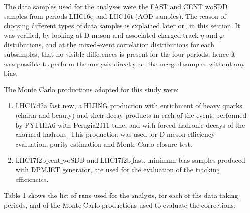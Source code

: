 The data samples used for the analyses were the FAST and CENT$\_$woSDD samples from periods LHC16q and LHC16t (AOD samples). The reason of choosing different types of data samples is explained later on, in this section. It was verified, by looking at D-meson and associated charged track $\eta$ and $\varphi$ distributions, and at the mixed-event correlation distributions for each subsamples, that no visible differences is present for the four periods, hence it was possible to perform the analysis directly on the merged samples without any bias.

The Monte Carlo productions adopted for this study were:
 \begin{enumerate}
 \item LHC17d2a$\_$fast$\_$new, a HIJING production with enrichment of heavy quarks (charm and beauty) and their decay products in each of the event, performed by PYTHIA6 with Perugia2011 tune, and with forced hadronic decays of the charmed hadrons. This production was used for D-meson efficiency evaluation, purity estimation and Monte Carlo closure test.
 \item LHC17f2b$\_$cent$\_$woSDD and LHC17f2b$\_$fast, minimum-bias samples produced with DPMJET generator, are used for the evaluation of the tracking efficiencies.
\end{enumerate}

Table 1 shows the list of runs used for the analysis, for each of the data taking periods, and of the Monte Carlo productions used to evaluate the corrections:

